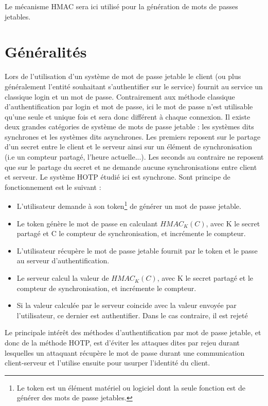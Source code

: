 \documentclass{../res/univ-projet}
\begin{document}
Le mécanisme HMAC sera ici utilisé pour la génération de mots de passes jetables.

\section{Généralités}
Lors de l'utilisation d'un système de mot de passe jetable le client (ou plus généralement l'entité souhaitant s'authentifier sur le service) fournit au service un 
classique login et un mot de passe. Contrairement aux méthode classique d'authentification par login et mot de passe, ici le mot de passe n'est utilisable qu'une seule et 
unique fois et sera donc différent à chaque connexion.
Il existe deux grandes catégories de système de mots de passe jetable : les systèmes dits \og{}synchrones\fg{} et les systèmes dits \og{}asynchrones\fg{}. Les premiers 
reposent sur le partage d'un secret entre le client et le serveur ainsi sur un élément de synchronisation (i.e un compteur partagé, l'heure actuelle...). Les seconds 
au contraire ne reposent que sur le partage du secret et ne demande aucune synchronisations entre client et serveur.
Le système \og{}HOTP\fg{} étudié ici est synchrone. Sont principe de fonctionnement est le suivant :
\begin{itemize}
 \item L'utilisateur demande à son token\footnote{Le token est un élément matériel ou logiciel dont la seule fonction est de générer des mots de passe jetables.} de 
 générer un mot de passe jetable.
 \item Le token génère le mot de passe en calculant $HMAC_K(C)$, avec K le secret partagé et C le compteur de synchronisation, et incrémente le compteur.
 \item L'utilisateur récupère le mot de passe jetable fournit par le token et le passe au serveur d'authentification.
 \item Le serveur calcul la valeur de $HMAC_K(C)$, avec K le secret partagé et le compteur de synchronisation, et incrémente le compteur.
 \item Si la valeur calculée par le serveur coincide avec la valeur envoyée par l'utilisateur, ce dernier est authentifier. Dans le cas contraire, il est rejeté
\end{itemize}

Le principale intér\^et des méthodes d'authentification par mot de passe jetable, et donc de la méthode HOTP, est d'éviter les attaques dites \og{}par rejeu\fg{} durant 
lesquelles un attaquant récupère le mot de passe durant une communication client-serveur et l'utilise ensuite pour usurper l'identité du client.
\end{document}
